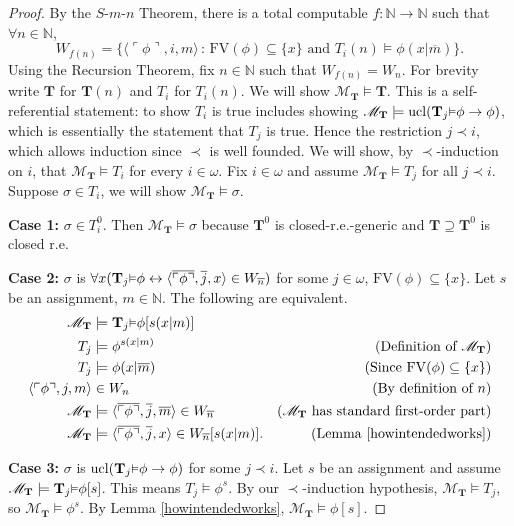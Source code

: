 \documentclass[reqno]{article}
\theoremstyle{definition}
\def\N{\mathbb{N}}
\def\M{\mathscr{M}}
\def\T{\mathbf{T}}
\def\FV{\mathrm{FV}}
\renewcommand{\Pr}[1]{\T_{#1}\mbox{\small${\vDash}$}}
\newcommand{\ucl}[1]{\mathrm{ucl}(#1)}
\newcommand{\case}[1]{\textbf{Case #1:}}
\begin{document}
\begin{proof}
By the $S$-$m$-$n$ Theorem, there is a total computable $f:\N\to\N$ such that $\forall n\in\N$,
\[
W_{f(n)}=\{\langle\ulcorner\phi\urcorner,i,m\rangle\,:\,
\mbox{$\FV(\phi)\subseteq\{x\}$ and $T_i(n)\models \phi(x|\overline m)$}\}.\]
Using the Recursion Theorem, fix $n\in\N$ such that
$W_{f(n)}=W_n$.
For brevity write $\T$ for $\T(n)$ and $T_i$ for $T_i(n)$.
We will show $\M_\T\models \T$.  This is a self-referential statement: to show $T_i$
is true includes
showing $\M_\T\models \ucl{\Pr j\phi\rightarrow\phi}$, which is essentially the
statement that $T_j$ is true.  Hence the restriction $j\prec i$, which allows induction
since $\prec$ is well founded.
We will show, by $\prec$-induction on $i$, that $\M_\T\models T_i$
for every $i\in\omega$.
Fix $i\in \omega$ and assume $\M_\T\models T_j$ for all $j\prec i$.
Suppose $\sigma\in T_i$, we will show $\M_\T\models\sigma$.


\item
\case1
$\sigma\in T^0_i$.
Then $\M_\T\models\sigma$ because $\T^0$ is closed-r.e.-generic and
$\T\supseteq\T^0$ is closed r.e.

\item
\case2
$\sigma$ is $\forall x(\Pr j\phi\leftrightarrow
\langle\overline{\ulcorner\phi\urcorner},\overline j,x\rangle\in W_{\overline n})$
for some $j\in\omega$, $\FV(\phi)\subseteq\{x\}$.
Let $s$ be an assignment, $m\in\N$.
The following are equivalent.
\begin{align*}
\M_{\T} &\models \Pr{j}\phi[s(x|m)]\\
T_j &\models \phi^{s(x|m)}
 &\mbox{(Definition of $\M_\T$)}\\
T_j &\models \phi(x|\overline m)
 &\mbox{(Since $\FV(\phi)\subseteq\{x\}$)}\\
\langle \ulcorner\phi\urcorner,j,m\rangle &\in W_n
 &\mbox{(By definition of $n$)}\\
\M_{\T} &\models \langle\overline{\ulcorner\phi\urcorner},\overline j,\overline m\rangle\in W_{\overline n}
 &\mbox{($\M_{\T}$ has standard first-order part)}\\
\M_{\T} &\models \langle\overline{\ulcorner\phi\urcorner},\overline j,x\rangle\in W_{\overline n}[s(x|m)].
 &\mbox{(Lemma \ref{howintendedworks})}
\end{align*}

\item
\case3
$\sigma$ is $\ucl{\Pr j\phi\rightarrow\phi}$ for some $j\prec i$.
Let $s$ be an assignment and assume $\M_\T\models\Pr j\phi[s]$.
This means $T_j\models\phi^s$.
By our $\prec$-induction hypothesis, 
$\M_\T\models T_j$,
so
$\M_\T\models \phi^s$.  By Lemma \ref{howintendedworks},
$\M_\T\models \phi[s]$.


\end{proof}
\end{document}
